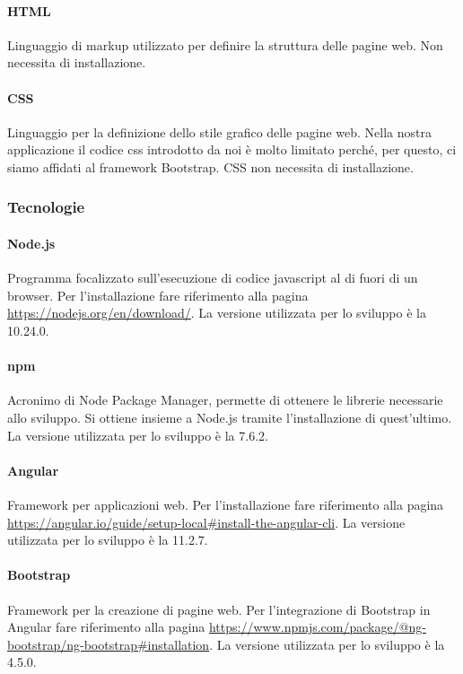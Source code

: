 \paragraph{HTML}
Linguaggio di markup utilizzato per definire la struttura delle pagine web. Non necessita di installazione.

\paragraph{CSS}
Linguaggio per la definizione dello stile grafico delle pagine web. Nella nostra applicazione il codice css introdotto da noi è molto limitato perché, per questo, ci siamo affidati al framework Bootstrap. CSS non necessita di installazione.

\subsubsection{Tecnologie}
\paragraph{Node.js}
Programma focalizzato sull'esecuzione di codice javascript al di fuori di un browser.
Per l'installazione fare riferimento alla pagina \url{https://nodejs.org/en/download/}. La versione utilizzata per lo sviluppo è la 10.24.0.
\paragraph{npm}
Acronimo di Node Package Manager, permette di ottenere le librerie necessarie allo sviluppo.
Si ottiene insieme a Node.js tramite l'installazione di quest'ultimo. La versione utilizzata per lo sviluppo è la 7.6.2.
\paragraph{Angular}
Framework per applicazioni web.
Per l'installazione fare riferimento alla pagina \url{https://angular.io/guide/setup-local#install-the-angular-cli}. La versione utilizzata per lo sviluppo è la 11.2.7.
\paragraph{Bootstrap}
Framework per la creazione di pagine web.
Per l'integrazione di Bootstrap in Angular fare riferimento alla pagina \url{https://www.npmjs.com/package/@ng-bootstrap/ng-bootstrap#installation}. La versione utilizzata per lo sviluppo è la 4.5.0.

